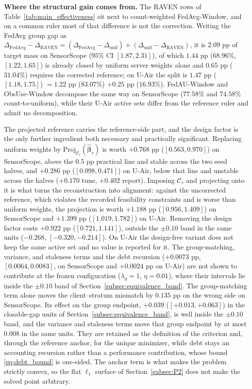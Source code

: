 \documentclass[letterpaper,journal]{IEEEtran}
\begin{document}
\noindent\textbf{Where the structural gain comes from.}
The RAVEN rows of Table~\ref{tab:main_effectiveness} sit next to count-weighted
FedAvg-Window, and on a common ruler most of that difference is not the
correction.  Writing the FedAvg group gap as
$\Delta_{\mathrm{FedAvg}}-\Delta_{\mathrm{RAVEN}}
=(\Delta_{\mathrm{FedAvg}}-\Delta_{\mathrm{unif}})
+(\Delta_{\mathrm{unif}}-\Delta_{\mathrm{RAVEN}})$, it is $2.09$ pp of target
mass on SensorScope ($95\%$ CI $[1.87,2.31]$), of which $1.44$ pp
($68.96\%$, $[1.22,1.65]$) is already closed by uniform server weights
alone and $0.65$ pp ($31.04\%$) requires the corrected reference; on U-Air the
split is $1.47$ pp ($[1.18,1.75]$) $=1.22$ pp ($83.07\%$) $+0.25$ pp
($16.93\%$).  FedAU-Window and ObsUse-Window decompose the same way on
SensorScope ($77.58\%$ and $74.58\%$ count-to-uniform), while their U-Air active
sets differ from the reference ruler and admit no decomposition.

The projected reference carries the reference-side part, and the design factor is
the only further ingredient both necessary and practically significant.
Replacing uniform weights by
$\mathrm{Proj}_{\mathcal{C}_r}(\widehat{\boldsymbol\beta}_r)$ is worth $+0.768$ pp
($[0.563,0.970]$) on SensorScope, above the $0.5$ pp practical line and stable
across the two seed halves, and $+0.286$ pp ($[0.098,0.471]$) on U-Air, below
that line and unstable across the halves ($+0.170$ tune, $+0.402$ report).
Imposing $\mathcal{C}_r$ and projecting onto it is what turns the reconstruction
into alignment: against the uncorrected reference, which violates the recorded
feasibility constraints and is worse than uniform weights,
the projection is worth $+1.188$ pp ($[0.956,1.409]$) on SensorScope and
$+1.399$ pp ($[1.019,1.782]$) on U-Air.  Removing the design factor costs
$+0.922$ pp ($[0.721,1.141]$), outside the $\pm0.10$ band in the same units
($-0.268$, $[-0.320,-0.214]$).  On U-Air the design-free variant does not keep
the same active set and no value is reported for it.  The group-matching,
variance, and staleness terms and the debt recursion
($+0.0073$ pp, $[0.0064,0.0083]$, on SensorScope and $+0.0024$ pp on U-Air)
are not shown to contribute at the frozen configuration
($\lambda_g=1$, $\eta=0.01$), where their intervals lie inside the $\pm0.10$
band of Section~\ref{subsec:equivalence_band}.  The group-matching term alone
moves the client--stratum mismatch by $0.135$ pp on the wrong side on
SensorScope.  Its effect on the group endpoint, $+0.039$
($[+0.013,+0.063]$) in the closable-gap units of
Section~\ref{subsec:equivalence_band}, is well inside the $\pm0.10$ band, and
the variance and staleness terms move that group endpoint by at most $0.008$ in
the same units.  They are retained as the
definition of the criterion and, through the reference anchor, for the unique
minimizer, while debt stays an accounting recursion rather than a performance
contribution, whose bound \eqref{eq:debt_bound} is one-sided.  The anchor term is
what makes the problem strictly convex, so the flat $\ell_1$ surface of
Section~\ref{subsec:P2} does not make the solved point arbitrary.
\end{document}
